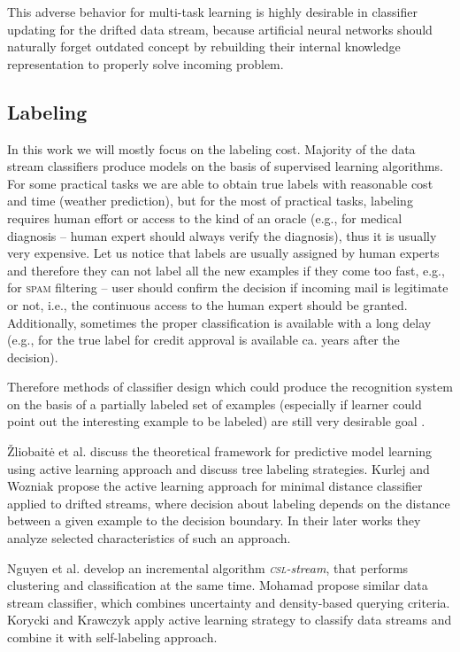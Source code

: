 This adverse behavior for multi-task learning is highly desirable in classifier updating for the drifted data stream, because artificial neural networks should naturally forget outdated concept by rebuilding their internal knowledge representation to properly solve incoming problem. 

\subsection{Labeling}
\noindent In this work we will mostly focus on the labeling cost. Majority of the data stream classifiers produce models on the basis of supervised learning algorithms. For some practical tasks we are able to obtain true labels with reasonable cost and time (weather prediction), but for the most of practical tasks, labeling requires human effort or access to the kind of an oracle (e.g., for medical diagnosis -- human expert should always verify the diagnosis), thus it is usually very expensive. Let us notice that labels are usually assigned by human experts and therefore they can not label all the new examples if they come too fast, e.g., for \textsc{spam} filtering -- user should confirm the decision if incoming mail is legitimate or not, i.e., the continuous access to the human expert should be granted. Additionally, sometimes the proper classification is available with a long delay (e.g., for the true label for credit approval is available ca.  years after the decision). 

Therefore methods of classifier design which could produce the recognition system on the basis of a partially labeled set of examples (especially if learner could point out the interesting example to be labeled) are still very desirable goal \cite{Greiner:2002}.

\v{Z}liobait\.{e} et al. \cite{Zliobaite:2014} discuss the theoretical framework for predictive model learning using active learning approach and discuss tree labeling strategies. Kurlej and Wozniak \cite{Kurlej:2012} propose the active learning approach for minimal distance classifier applied to drifted streams, where decision about labeling depends on the distance between a given example to the decision boundary. In their later works \cite{Kurlej:2011,Kurlej:2011a} they analyze selected characteristics of such an approach.   

Nguyen et al. \cite{Nguyen:2013} develop an incremental algorithm \emph{\textsc{csl}-stream}, that performs clustering and classification at the same time. Mohamad \cite{Mohamad:2018} propose similar data stream classifier, which combines uncertainty and density-based querying criteria. Korycki and Krawczyk \cite{Korycki:2018} apply active learning strategy to classify data streams and combine it with self-labeling approach.

